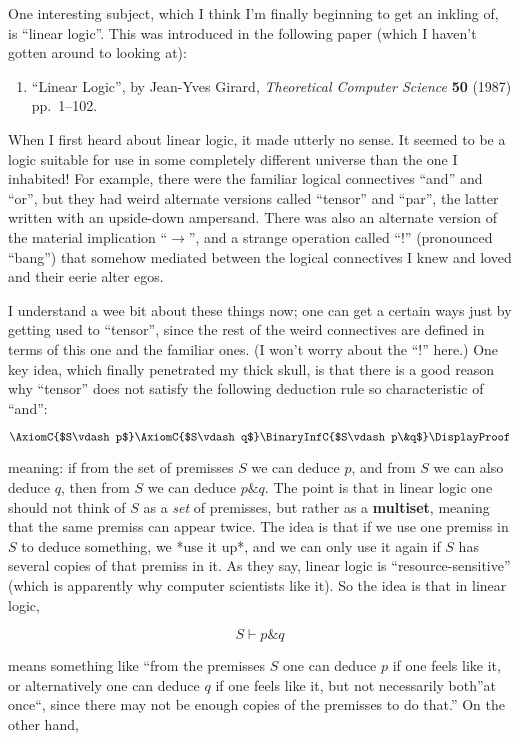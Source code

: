 \documentclass{article}
\def\tightlist{}
\begin{document}
One interesting subject, which I think I'm finally beginning to get an
inkling of, is ``linear logic''. This was introduced in the following
paper (which I haven't gotten around to looking at):

\begin{enumerate}
\def\labelenumi{\arabic{enumi})}
\tightlist
\item
  ``Linear Logic'', by Jean-Yves Girard, \emph{Theoretical Computer
  Science} \textbf{50} (1987) pp.~1--102.
\end{enumerate}

When I first heard about linear logic, it made utterly no sense. It
seemed to be a logic suitable for use in some completely different
universe than the one I inhabited! For example, there were the familiar
logical connectives ``and'' and ``or'', but they had weird alternate
versions called ``tensor'' and ``par'', the latter written with an
upside-down ampersand. There was also an alternate version of the
material implication ``\(\to\)'', and a strange operation called
``\(!\)'' (pronounced ``bang'') that somehow mediated between the
logical connectives I knew and loved and their eerie alter egos.

I understand a wee bit about these things now; one can get a certain
ways just by getting used to ``tensor'', since the rest of the weird
connectives are defined in terms of this one and the familiar ones. (I
won't worry about the ``\(!\)'' here.) One key idea, which finally
penetrated my thick skull, is that there is a good reason why ``tensor''
does not satisfy the following deduction rule so characteristic of
``and'':

\[\AxiomC{$S\vdash p$}\AxiomC{$S\vdash q$}\BinaryInfC{$S\vdash p\&q$}\DisplayProof\]

meaning: if from the set of premisses \(S\) we can deduce \(p\), and
from \(S\) we can also deduce \(q\), then from \(S\) we can deduce
\(p\&q\). The point is that in linear logic one should not think of
\(S\) as a \emph{set} of premisses, but rather as a \textbf{multiset},
meaning that the same premiss can appear twice. The idea is that if we
use one premiss in \(S\) to deduce something, we *use it up*, and we can
only use it again if \(S\) has several copies of that premiss in it. As
they say, linear logic is ``resource-sensitive'' (which is apparently
why computer scientists like it). So the idea is that in linear logic,

\[S\vdash p\&q\]

means something like ``from the premisses \(S\) one can deduce \(p\) if
one feels like it, or alternatively one can deduce \(q\) if one feels
like it, but not necessarily both''at once``, since there may not be
enough copies of the premisses to do that.'' On the other hand,
\end{document}
